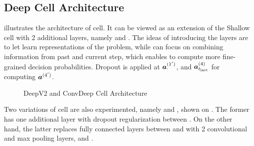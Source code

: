 \subsection{Deep Cell Architecture}
%

\addfigure{\ref{fig:s3_network}} illustrates the architecture of   cell. It can be viewed as  an extension of the Shallow cell with  2 additional layers, namely  and .  The ideas of introducing the layers are to let  learn representations of the problem, while  can focus on combining information from past and current step, which enables  to compute more fine-grained decision probabilities. Dropout is applied at $\patvector{a}^{(1')}_{\cdot}$, and $\patvector{a}^{(4)}_{t_\text{last}}$ for computing $\patvector{a}^{(4')}$.

\begin{figure}[!htb]
\centering

     \hfill

\caption{DeepV2 and ConvDeep Cell Architecture}
\label{fig:deep_conv_arch}
\end{figure}
%
%
%
%
%

Two variations of  cell are also experimented, namely  and , shown on \addfigure{\ref{fig:deep_conv_arch}}. The former has one additional layer  with dropout regularization  between . On the other hand, the latter replaces fully connected layers between  and  with 2 convolutional and max pooling layers,  and .




